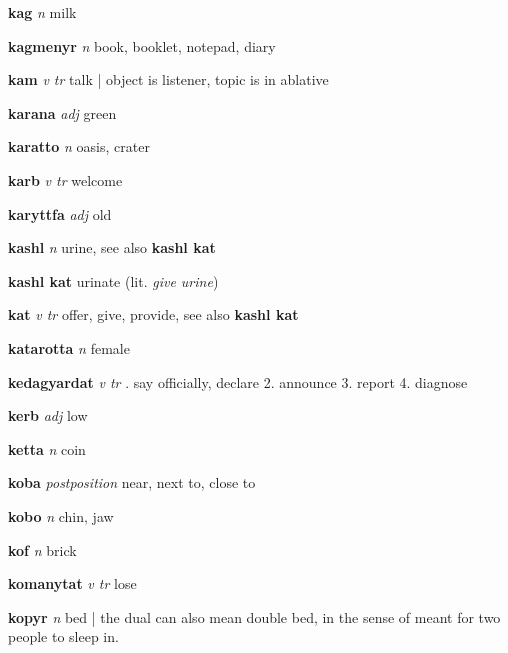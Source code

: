 \textbf{kag}   \emph{n} \textperiodcentered milk

\textbf{kagmenyr}   \emph{n} \textperiodcentered book, booklet, notepad, diary

\textbf{kam}   \emph{v tr} \textperiodcentered talk | object is listener, topic is in ablative

\textbf{karana}   \emph{adj} \textperiodcentered green

\textbf{karatto}   \emph{n} \textperiodcentered oasis, crater

\textbf{karb}   \emph{v tr} \textperiodcentered welcome

\textbf{karyttfa}   \emph{adj} \textperiodcentered old

\textbf{kashl}   \emph{n} \textperiodcentered urine, see also \textbf{kashl kat}

\textbf{kashl kat}    \textperiodcentered urinate (lit. \emph{give urine})

\textbf{kat}   \emph{v tr} \textperiodcentered offer, give, provide, see also \textbf{kashl kat}

\textbf{katarotta}   \emph{n} \textperiodcentered female

\textbf{kedagyardat}   \emph{v tr} . say officially, declare 2. announce 3. report 4. diagnose 

\textbf{kerb}   \emph{adj} \textperiodcentered low

\textbf{ketta}   \emph{n} \textperiodcentered coin

\textbf{koba}   \emph{postposition} \textperiodcentered near, next to, close to

\textbf{kobo}   \emph{n} \textperiodcentered chin, jaw

\textbf{kof}   \emph{n} \textperiodcentered brick

\textbf{komanytat}   \emph{v tr} \textperiodcentered lose

\textbf{kopyr}   \emph{n} \textperiodcentered bed | the dual can also mean double bed, in the sense of meant for two people to sleep in.

